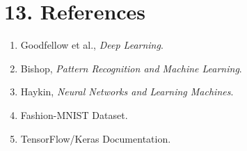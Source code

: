\documentclass[11pt]{article}
\begin{document}





\section*{13. References}
\begin{enumerate}
\item Goodfellow et al., \emph{Deep Learning}.
\item Bishop, \emph{Pattern Recognition and Machine Learning}.
\item Haykin, \emph{Neural Networks and Learning Machines}.
\item Fashion-MNIST Dataset.
\item TensorFlow/Keras Documentation.
\end{enumerate}
\end{document}

